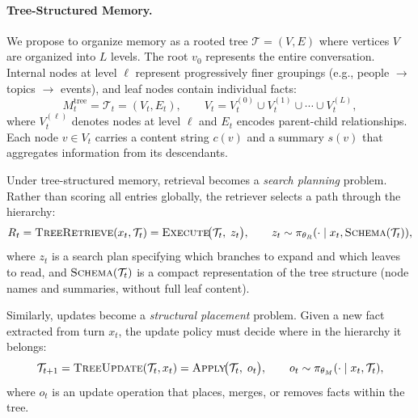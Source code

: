 \paragraph{Tree-Structured Memory.}
We propose to organize memory as a rooted tree $\mathcal{T} = (V, E)$ where vertices $V$ are organized into $L$ levels. The root $v_0$ represents the entire conversation. Internal nodes at level $\ell$ represent progressively finer groupings (e.g., people $\to$ topics $\to$ events), and leaf nodes contain individual facts:
\begin{equation}
M_t^{\text{tree}} = \mathcal{T}_t = (V_t, E_t), \qquad V_t = V_t^{(0)} \cup V_t^{(1)} \cup \cdots \cup V_t^{(L)},
\end{equation}
where $V_t^{(\ell)}$ denotes nodes at level $\ell$ and $E_t$ encodes parent-child relationships. Each node $v \in V_t$ carries a content string $c(v)$ and a summary $s(v)$ that aggregates information from its descendants.

Under tree-structured memory, retrieval becomes a \emph{search planning} problem. Rather than scoring all entries globally, the retriever selects a path through the hierarchy:
\begin{equation}\label{eq:tree_retrieve}
R_t = \textsc{TreeRetrieve}(x_t, \mathcal{T}_t) = \textsc{Execute}\!\big(\mathcal{T}_t,\; z_t\big), \qquad z_t \sim \pi_{\theta_R}(\cdot \mid x_t, \textsc{Schema}(\mathcal{T}_t)),
\end{equation}
where $z_t$ is a search plan specifying which branches to expand and which leaves to read, and $\textsc{Schema}(\mathcal{T}_t)$ is a compact representation of the tree structure (node names and summaries, without full leaf content).

Similarly, updates become a \emph{structural placement} problem. Given a new fact extracted from turn $x_t$, the update policy must decide where in the hierarchy it belongs:
\begin{equation}\label{eq:tree_update}
\mathcal{T}_{t+1} = \textsc{TreeUpdate}(\mathcal{T}_t, x_t) = \textsc{Apply}\!\big(\mathcal{T}_t,\; o_t\big), \qquad o_t \sim \pi_{\theta_M}(\cdot \mid x_t, \mathcal{T}_t),
\end{equation}
where $o_t$ is an update operation that places, merges, or removes facts within the tree.

